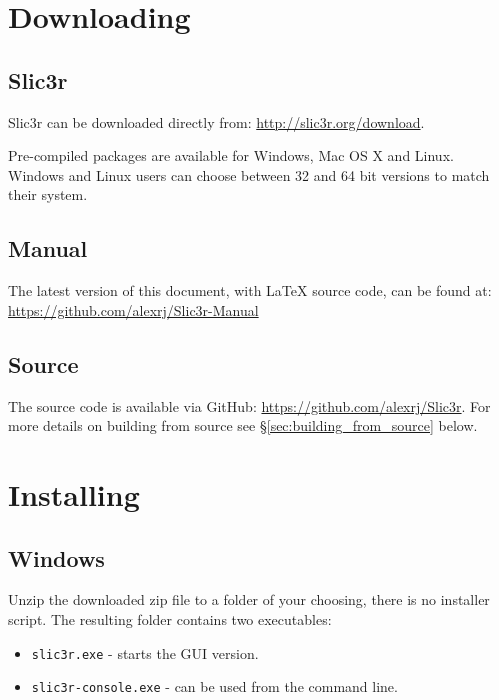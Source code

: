 

\section{Downloading}

\subsection{Slic3r} %
\label{sub:slic3r}
Slic3r can be downloaded directly from: \url{http://slic3r.org/download}.

Pre-compiled packages are available for Windows, Mac OS X and Linux.  Windows and Linux users can choose between 32 and 64 bit versions to match their system.

\subsection{Manual} %
\label{sub:manual}

The latest version of this document, with {\LaTeX} source code, can be found at: \url{https://github.com/alexrj/Slic3r-Manual}


\subsection{Source} %
\label{sub:source}

The source code is available via GitHub: \url{https://github.com/alexrj/Slic3r}. For more details on building from source see §\ref{sec:building_from_source} below.


\section{Installing}

\subsection{Windows}

Unzip the downloaded zip file to a folder of your choosing, there is no installer script. The resulting folder contains two executables:
\begin{itemize}
\item \texttt{slic3r.exe} - starts the GUI version.
\item \texttt{slic3r-console.exe} - can be used from the command line.
\end{itemize}

